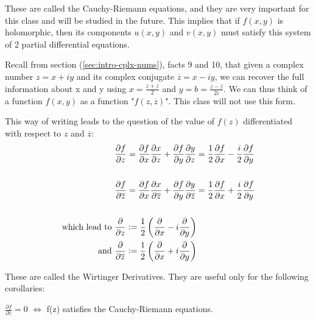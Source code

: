 These are called the Cauchy-Riemann equations, and they are very important for this class and will be studied in the future. This implies that if $f(x,y)$ is holomorphic, then its components $u(x,y)$ and $v(x,y)$ must satisfy this system of 2 partial differential equations.

\begin{remark}
Recall from section (\ref{sec:intro-cplx-nums}), facts 9 and 10, that given a complex number $z=x+iy$ and its complex conjugate $\overline{z} = x-iy$, we can recover the full information about x and y using $x=\frac{z+\overline{z}}{2}$ and $y=b = \frac{z-\overline{z}}{2i}$. We can thus think of a function $f(x,y)$ as a function "$f(z,\overline{z})$". This class will not use this form.
\end{remark}


This way of writing leads to the question of the value of $f(z)$ differentiated with respect to $z$ and $\overline{z}$:
\begin{align*}
    &\frac{\partial f}{\partial z} = \frac{\partial f}{\partial x}\frac{\partial  x}{\partial z} + \frac{\partial f}{\partial y}\frac{\partial y}{\partial z} = \frac{1}{2} \frac{\partial f}{\partial x} - \frac{i}{2} \frac{\partial f}{\partial y}\\\\
    &\frac{\partial f}{\partial \overline{z}} = \frac{\partial f}{\partial x}\frac{\partial  x}{\partial \overline{z}} + \frac{\partial f}{\partial y}\frac{\partial y}{\partial \overline{z}} = \frac{1}{2} \frac{\partial f}{\partial x} + \frac{i}{2} \frac{\partial f}{\partial y}\\\\
    \text{which lead to }&\frac{\partial}{\partial z} \vcentcolon= \frac{1}{2} \left( \frac{\partial}{\partial x} - i\frac{\partial}{\partial y} \right)\\
   \text{and } &\frac{\partial}{\partial \overline{z}} \vcentcolon= \frac{1}{2} \left( \frac{\partial}{\partial x} + i\frac{\partial}{\partial y} \right)
\end{align*}

These are called the Wirtinger Derivatives. They are useful only for the following corollaries:
\begin{corollary}\label{cor:wirt-iff-CR}
$\frac{\partial f}{\partial \overline{z}} = 0$ $\Leftrightarrow$ f(z) satisfies the Cauchy-Riemann equations.
\end{corollary}

